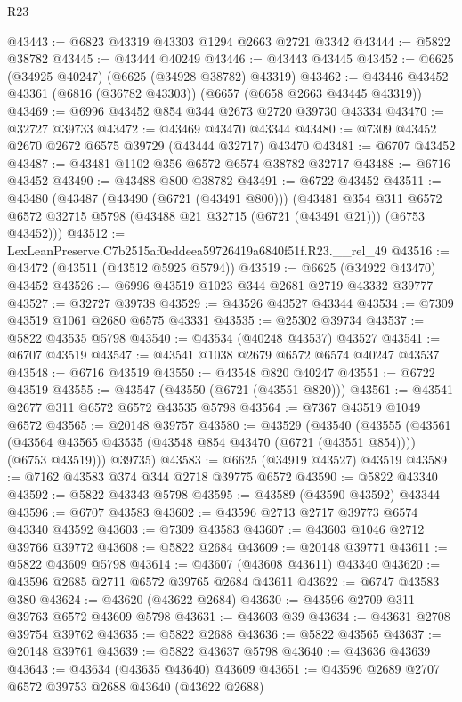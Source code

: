 \begin{lexlean}{R23}
\begin{coremodule}
@43443 := @6823 @43319 @43303 @1294 @2663 @2721 @3342
@43444 := @5822 @38782
@43445 := @43444 @40249
@43446 := @43443 @43445
@43452 := @6625 (@34925 @40247) (@6625 (@34928 @38782) @43319)
@43462 := @43446 @43452 @43361 (@6816 (@36782 @43303)) (@6657 (@6658 @2663 @43445 @43319))
@43469 := @6996 @43452 @854 @344 @2673 @2720 @39730 @43334
@43470 := @32727 @39733
@43472 := @43469 @43470 @43344
@43480 := @7309 @43452 @2670 @2672 @6575 @39729 (@43444 @32717) @43470
@43481 := @6707 @43452
@43487 := @43481 @1102 @356 @6572 @6574 @38782 @32717
@43488 := @6716 @43452
@43490 := @43488 @800 @38782
@43491 := @6722 @43452
@43511 := @43480
    (@43487
      (@43490 (@6721 (@43491 @800)))
      (@43481
        @354
        @311
        @6572
        @6572
        @32715
        @5798
        (@43488 @21 @32715 (@6721 (@43491 @21)))
        (@6753 @43452)))
@43512 := LexLeanPreserve.C7b2515af0eddeea59726419a6840f51f.R23.__rel_49
@43516 := @43472 (@43511 (@43512 @5925 @5794))
@43519 := @6625 (@34922 @43470) @43452
@43526 := @6996 @43519 @1023 @344 @2681 @2719 @43332 @39777
@43527 := @32727 @39738
@43529 := @43526 @43527 @43344
@43534 := @7309 @43519 @1061 @2680 @6575 @43331
@43535 := @25302 @39734
@43537 := @5822 @43535 @5798
@43540 := @43534 (@40248 @43537) @43527
@43541 := @6707 @43519
@43547 := @43541 @1038 @2679 @6572 @6574 @40247 @43537
@43548 := @6716 @43519
@43550 := @43548 @820 @40247
@43551 := @6722 @43519
@43555 := @43547 (@43550 (@6721 (@43551 @820)))
@43561 := @43541 @2677 @311 @6572 @6572 @43535 @5798
@43564 := @7367 @43519 @1049 @6572
@43565 := @20148 @39757
@43580 := @43529
    (@43540
      (@43555
        (@43561 (@43564 @43565 @43535 (@43548 @854 @43470 (@6721 (@43551 @854)))) (@6753 @43519)))
      @39735)
@43583 := @6625 (@34919 @43527) @43519
@43589 := @7162 @43583 @374 @344 @2718 @39775 @6572
@43590 := @5822 @43340
@43592 := @5822 @43343 @5798
@43595 := @43589 (@43590 @43592) @43344
@43596 := @6707 @43583
@43602 := @43596 @2713 @2717 @39773 @6574 @43340 @43592
@43603 := @7309 @43583
@43607 := @43603 @1046 @2712 @39766 @39772
@43608 := @5822 @2684
@43609 := @20148 @39771
@43611 := @5822 @43609 @5798
@43614 := @43607 (@43608 @43611) @43340
@43620 := @43596 @2685 @2711 @6572 @39765 @2684 @43611
@43622 := @6747 @43583 @380
@43624 := @43620 (@43622 @2684)
@43630 := @43596 @2709 @311 @39763 @6572 @43609 @5798
@43631 := @43603 @39
@43634 := @43631 @2708 @39754 @39762
@43635 := @5822 @2688
@43636 := @5822 @43565
@43637 := @20148 @39761
@43639 := @5822 @43637 @5798
@43640 := @43636 @43639
@43643 := @43634 (@43635 @43640) @43609
@43651 := @43596 @2689 @2707 @6572 @39753 @2688 @43640 (@43622 @2688)

\end{coremodule}
\end{lexlean}
